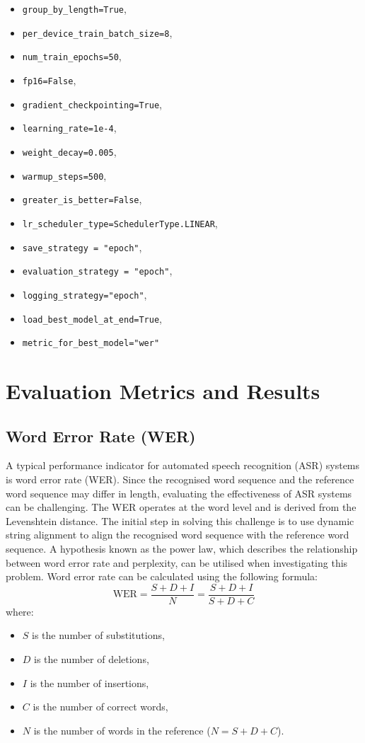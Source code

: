 \documentclass[conference]{IEEEtran}
\begin{document}
\begin{itemize}
    \item \texttt{group\_by\_length=True},
    \item \texttt{per\_device\_train\_batch\_size=8},
    \item \texttt{num\_train\_epochs=50},
    \item \texttt{fp16=False},
    \item \texttt{gradient\_checkpointing=True},
    \item \texttt{learning\_rate=1e-4},
    \item \texttt{weight\_decay=0.005},
    \item \texttt{warmup\_steps=500},
    \item \texttt{greater\_is\_better=False},
    \item \texttt{lr\_scheduler\_type=SchedulerType.LINEAR},
    \item \texttt{save\_strategy = "epoch"},
    \item \texttt{evaluation\_strategy = "epoch"},
    \item \texttt{logging\_strategy="epoch"},
    \item \texttt{load\_best\_model\_at\_end=True},
    \item \texttt{metric\_for\_best\_model="wer"}
    \end{itemize}

\section{Evaluation Metrics and Results}

\subsection{Word Error Rate (WER)}

\quad \quad A typical performance indicator for automated speech recognition (ASR) systems is word error rate (WER). Since the recognised word sequence and the reference word sequence may differ in length, evaluating the effectiveness of ASR systems can be challenging. The WER operates at the word level and is derived from the Levenshtein distance. The initial step in solving this challenge is to use dynamic string alignment to align the recognised word sequence with the reference word sequence. A hypothesis known as the power law, which describes the relationship between word error rate and perplexity, can be utilised when investigating this problem. Word error rate can be calculated using the following formula:
\[
\text{WER} = \frac{S + D + I}{N} = \frac{S + D + I}{S + D + C}
\]
where:
\begin{itemize}
    \item \( S \) is the number of substitutions,
    \item \( D \) is the number of deletions,
    \item \( I \) is the number of insertions,
    \item \( C \) is the number of correct words,
    \item \( N \) is the number of words in the reference (\( N=S+D+C \)). \cite{woodard1982}
\end{itemize} 
\end{document}
